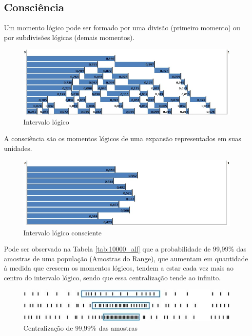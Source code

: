\subsection{Consciência}
Um momento lógico pode ser formado por uma divisão (primeiro momento) ou por subdivisões lógicas (demais momentos).
	\begin{figure}[H]
	\caption{Intervalo lógico}
	\label{fig:consciousness_logical_moments}
	\centering
	\includegraphics[scale=.7]{sections/images/consciousness_logical_moments.jpg}
	\end{figure}

A consciência são os momentos lógicos de uma expansão representados em suas unidades.
	\begin{figure}[H]
	\caption{Intervalo lógico consciente}
	\label{fig:consciousness}
	\centering
	\includegraphics[scale=.7]{sections/images/consciousness.jpg}
	\end{figure}

Pode ser observado na Tabela \ref{tab:10000_all} que a probabilidade de 99,99\% das amostras de uma população (Amostras do Range), que aumentam em quantidade à medida que crescem os momentos lógicos, tendem a estar cada vez mais ao centro do intervalo lógico, sendo que essa centralização tende ao infinito.
	\begin{figure}[H]
	\caption{Centralização de 99,99\% das amostras}
	\label{fig:centering_of_99_range}
	\centering
	\includegraphics[scale=1]{sections/images/centering_of_99_range.jpg}
	\end{figure}


